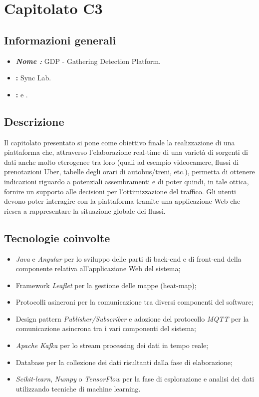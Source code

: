 \section{Capitolato C3}

\subsection{Informazioni generali}{
\begin{itemize}
\item \textbf{\emph{Nome :}} GDP - Gathering Detection Platform.
\item \textbf{\commitProg:} Sync Lab.
\item \textbf{\proponProg:} \VT{} e \CR.
\end{itemize}
}

\subsection{Descrizione}{
Il capitolato presentato si pone come obiettivo finale la realizzazione di una piattaforma che, attraverso l'elaborazione real-time di una varietà di sorgenti di dati anche molto eterogenee tra loro (quali ad esempio videocamere, flussi di prenotazioni Uber, tabelle degli orari di autobus/treni, etc.), permetta di ottenere indicazioni riguardo a potenziali assembramenti e di poter quindi, in tale ottica, fornire un supporto alle decisioni per l'ottimizzazione del traffico.
Gli utenti devono poter interagire con la piattaforma tramite una applicazione Web che riesca a rappresentare la situazione globale dei flussi.
}

\subsection{Tecnologie coinvolte}{
\begin{itemize}
\item \textit{Java} e \textit{Angular} per lo sviluppo delle parti di back-end e di front-end della componente relativa all'applicazione Web del sistema; 
\item Framework \textit{Leaflet} per la gestione delle mappe (heat-map);
\item Protocolli asincroni per la comunicazione tra diversi componenti del software;
\item Design pattern \textit{Publisher/Subscriber} e adozione del protocollo \textit{MQTT} per la comunicazione asincrona tra i vari componenti del sistema;
\item \textit{Apache Kafka} per lo stream processing dei dati in tempo reale;
\item Database per la collezione dei dati risultanti dalla fase di elaborazione;
\item \textit{Scikit-learn}, \textit{Numpy} o \textit{TensorFlow} per la fase di esplorazione e analisi dei dati utilizzando tecniche di machine learning.
\end{itemize}
}

